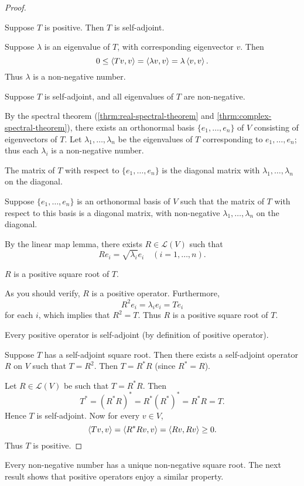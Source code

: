 \begin{proof} \

 Suppose $T$ is positive. Then $T$ is self-adjoint. 

Suppose $\lambda$ is an eigenvalue of $T$, with corresponding eigenvector $v$. Then
\[0\le\left\langle Tv,v\right\rangle=\left\langle\lambda v,v\right\rangle=\lambda\left\langle v,v\right\rangle.\]
Thus $\lambda$ is a non-negative number.

 Suppose $T$ is self-adjoint, and all eigenvalues of $T$ are non-negative. 

By the spectral theorem (\ref{thrm:real-spectral-theorem} and \ref{thrm:complex-spectral-theorem}), there exists an orthonormal basis $\{e_1,\dots,e_n\}$ of $V$ consisting of eigenvectors of $T$. 
Let $\lambda_1,\dots,\lambda_n$ be the eigenvalues of $T$ corresponding to $e_1,\dots,e_n$; thus each $\lambda_i$ is a non-negative number. 

The matrix of $T$ with respect to $\{e_1,\dots,e_n\}$ is the diagonal matrix with $\lambda_1,\dots,\lambda_n$ on the diagonal.

 Suppose $\{e_1,\dots,e_n\}$ is an orthonormal basis of $V$ such that the matrix of $T$ with respect to this basis is a diagonal matrix, with non-negative $\lambda_1,\dots,\lambda_n$ on the diagonal. 

By the linear map lemma, there exists $R\in\mathcal{L}(V)$ such that
\[Re_i=\sqrt{\lambda_i}e_i\quad(i=1,\dots,n).\]
\begin{claim}
$R$ is a positive square root of $T$.
\end{claim}
As you should verify, $R$ is a positive operator. Furthermore,
\[R^2e_i=\lambda_ie_i=Te_i\]
for each $i$, which implies that $R^2=T$. Thus $R$ is a positive square root of $T$.

 Every positive operator is self-adjoint (by definition of positive operator).

 Suppose $T$ has a self-adjoint square root. Then there exists a self-adjoint operator $R$ on $V$ such that $T=R^2$. Then $T=R^*R$ (since $R^*=R$).

 Let $R\in\mathcal{L}(V)$ be such that $T=R^*R$. Then
\[T^*=(R^*R)^*=R^*(R^*)^*=R^*R=T.\]
Hence $T$ is self-adjoint. Now for every $v\in V$,
\[\left\langle Tv,v\right\rangle=\left\langle R^*Rv,v\right\rangle=\left\langle Rv,Rv\right\rangle\ge0.\]
Thus $T$ is positive.
\end{proof}

Every non-negative number has a unique non-negative square root. The next result shows that positive operators enjoy a similar property.

